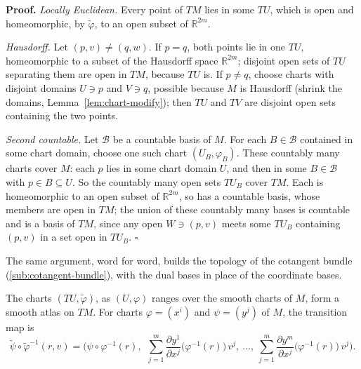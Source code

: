 \documentclass[11pt]{report}
\makeatletter
\newcounter{thmcounter}[section]
\renewenvironment{proof}[1][Proof]{\noindent\textbf{#1.} }{\hfill$\square$\par\vspace{5pt}}
\newcommand{\thmlabel}[1]{\edef\@currentlabel{\arabic{section}.\arabic{thmcounter}}\label{#1}}
\newcommand{\leeref}[1]{\par\smallskip{\raggedleft\footnotesize\textsc{Lee}:\ #1\par}}
\makeatother
\begin{document}
\begin{proof}
\emph{Locally Euclidean.} Every point of $TM$ lies in some $TU$, which is open and homeomorphic, by $\tilde\varphi$, to an open subset of $\mathbb{R}^{2m}$.

\emph{Hausdorff.} Let $(p, v) \ne (q, w)$. If $p = q$, both points lie in one $TU$, homeomorphic to a subset of the Hausdorff space $\mathbb{R}^{2m}$; disjoint open sets of $TU$ separating them are open in $TM$, because $TU$ is. If $p \ne q$, choose charts with disjoint domains $U \ni p$ and $V \ni q$, possible because $M$ is Hausdorff (shrink the domains, Lemma~\ref{lem:chart-modify}); then $TU$ and $TV$ are disjoint open sets containing the two points.

\emph{Second countable.} Let $\mathcal{B}$ be a countable basis of $M$. For each $B \in \mathcal{B}$ contained in some chart domain, choose one such chart $(U_B, \varphi_B)$. These countably many charts cover $M$: each $p$ lies in some chart domain $U$, and then in some $B \in \mathcal{B}$ with $p \in B \subseteq U$. So the countably many open sets $TU_B$ cover $TM$. Each is homeomorphic to an open subset of $\mathbb{R}^{2m}$, so has a countable basis, whose members are open in $TM$; the union of these countably many bases is countable and is a basis of $TM$, since any open $W \ni (p, v)$ meets some $TU_B$ containing $(p, v)$ in a set open in $TU_B$.
\end{proof}

The same argument, word for word, builds the topology of the cotangent bundle (\ref{sub:cotangent-bundle}), with the dual bases in place of the coordinate bases.

\begin{propbox}\thmlabel{prop:tb-atlas}
The charts $(TU, \tilde\varphi)$, as $(U, \varphi)$ ranges over the smooth charts of $M$, form a smooth atlas on $TM$. For charts $\varphi = (x^i)$ and $\psi = (y^j)$ of $M$, the transition map is
\[
\tilde\psi \circ \tilde\varphi^{-1}(r, v) = \Big( \psi \circ \varphi^{-1}(r), \ \ \sum_{j=1}^m \frac{\partial y^1}{\partial x^j}\big(\varphi^{-1}(r)\big)\, v^j, \ \ldots, \ \sum_{j=1}^m \frac{\partial y^m}{\partial x^j}\big(\varphi^{-1}(r)\big)\, v^j \Big) .
\]
\leeref{Proposition 3.18}
\end{propbox}
\end{document}
